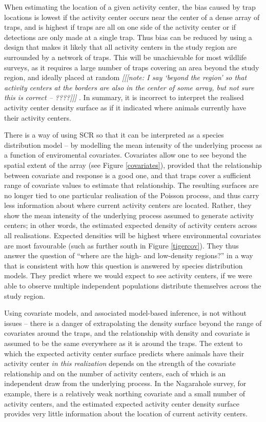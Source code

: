 \documentclass[a4paper,12pt]{article}
\begin{document}
When estimating the location of a given activity center, the bias caused by trap locations is lowest if the activity center occurs near the center of a dense array of traps, and is highest if traps are all on one side of the activity center or if detections are only made at a single trap. Thus bias can be reduced by using a design that makes it likely that all activity centers in the study region are surrounded by a network of traps. This will be unachievable for most wildlife surveys, as it requires a large number of traps covering an area beyond the study region, and ideally placed at random {\it [[[note: I say `beyond the region' so that activity centers at the borders are also in the center of some array, but not sure this is correct -- ????]]]} . In summary, it is incorrect to interpret the realised activity center density surface as if it indicated where animals currently have their activity centers. 

There is a way of using SCR so that it can be interpreted as a species distribution model -- by modelling the mean intensity of the underlying process as a function of enviromental covariates. Covariates allow one to see beyond the spatial extent of the array (see Figure \ref{covariates}), provided that the relationship between covariate and response is a good one, and that traps cover a sufficient range of covariate values to estimate that relationship. The resulting surfaces are no longer tied to one particular realisation of the Poisson process, and thus carry less information about where current activity centers are located. Rather, they show the mean intensity of the underlying process assumed to generate activity centers; in other words, the estimated expected density of activity centers across all realisations. Expected densities will be highest where environmental covariates are most favourable (such as further south in Figure \ref{tigercov}). They thus answer the question of ``where are the high- and low-density regions?'' in a way that is consistent with how this question is answered by species distribution models. They predict where we would expect to see activity centers, if we were able to observe multiple independent populations distribute themselves across the study region. 

Using covariate models, and associated model-based inference, is not without issues -- there is a danger of extrapolating the density surface beyond the range of covariates around the traps, and the relationship with density and covariate is assumed to be the same everywhere as it is around the traps. The extent to which the expected activity center surface predicts where animals have their activity center {\it in this realization} depends on the strength of the covariate relationship and on the number of activity centers, each of which is an independent draw from the underlying process. In the Nagarahole survey, for example, there is a relatively weak northing covariate and a small number of activity centers, and the estimated expected activity center density surface provides very little information about the location of current activity centers. 
\end{document}
